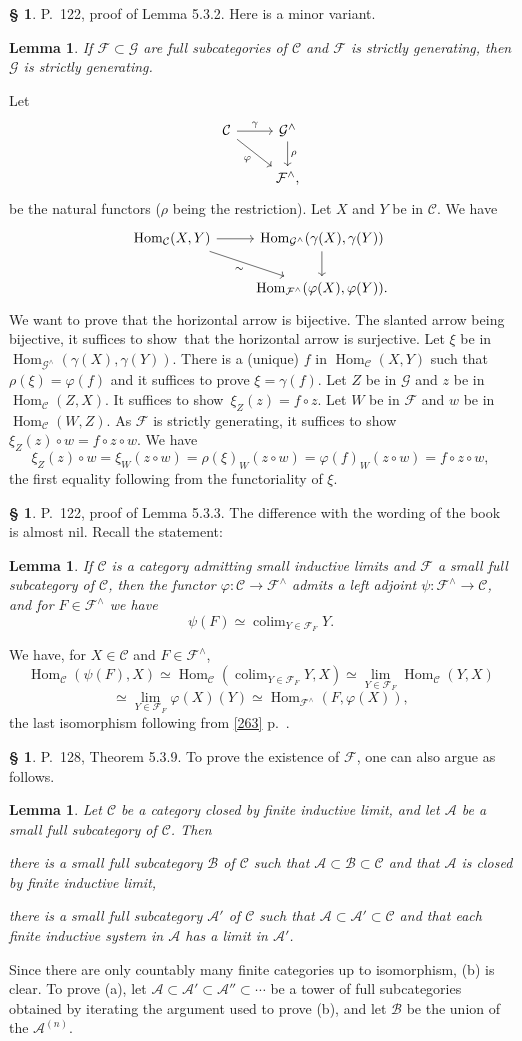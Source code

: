 \documentclass[12pt]{article}
\newtheorem{lem}[thm]{Lemma}
\theoremstyle{remark}
\theoremstyle{definition}
\newtheorem{cm}[thm]{\S}
\newcommand{\bc}{\begin{cm}}\newcommand{\ec}{\end{cm}}
\newcommand{\n}{\noindent}
\newcommand{\A}{\mathcal A}
\newcommand{\B}{\mathcal B}
\newcommand{\C}{\mathcal C}
\newcommand{\F}{\mathcal F}
\newcommand{\G}{\mathcal G}
\newcommand{\p}{\varphi}
\newcommand{\pf}{\n{\em Proof. }}
\newcommand{\bl}{\begin{lem}}
\newcommand{\el}{\end{lem}}
\newcommand{\sts}{t suffices to show}
\DeclareMathOperator*{\co}{colim}
\DeclareMathOperator{\h}{Hom}
\begin{document}

\bc P.~122, proof of Lemma 5.3.2. Here is a minor variant. 
%
\bl 
If $\F\subset\G$ are full subcategories of $\C$ and $\F$ is strictly generating, then $\G$ is strictly generating. 
\el 
%
\pf Let 
$$
\begin{tikzcd}
\C\ar{r}{\gamma}\ar{dr}[swap]{\p}&\G^\wedge\ar{d}{\rho}\\
&\F^\wedge,
\end{tikzcd}
$$ 
be the natural functors ($\rho$ being the restriction). Let $X$ and $Y$ be in $\C$. We have 
$$
\begin{tikzcd}
\h_\C(X,Y)\ar{r}\ar{dr}[swap]{\sim}&\h_{\G^\wedge}(\gamma(X),\gamma(Y))\ar{d}\\
&\h_{\F^\wedge}(\p(X),\p(Y)). 
\end{tikzcd}
$$ 
We want to prove that the horizontal arrow is bijective. The slanted arrow being bijective, i\sts\ that the horizontal arrow is surjective. Let $\xi$ be in $\h_{\G^\wedge}(\gamma(X),\gamma(Y))$. There is a (unique) $f$ in $\h_\C(X,Y)$ such that $\rho(\xi)=\p(f)$ and it suffices to prove $\xi=\gamma(f)$. Let $Z$ be in $\G$ and $z$ be in $\h_\C(Z,X)$. I\sts\ $\xi_Z(z)=f\circ z$. Let $W$ be in $\F$ and $w$ be in $\h_\C(W,Z)$. As $\F$ is strictly generating, i\sts\ $\xi_Z(z)\circ w=f\circ z\circ w$. We have 
$$
\xi_Z(z)\circ w=\xi_W(z\circ w)=\rho(\xi)_W(z\circ w)=\p(f)_W(z\circ w)
=f\circ z\circ w, 
$$ 
the first equality following from the functoriality of $\xi$.
\ec 


\bc P.~122, proof of Lemma 5.3.3. The difference with the wording of the book is almost nil. Recall the statement: 
% 
\bl
If $\C$ is a category admitting small inductive limits and $\F$ a small full subcategory of $\C$, then the functor $\p:\C\to\F^\wedge$ admits a left adjoint $\psi:\F^\wedge\to\C$, and for $F\in\F^\wedge$ we have 
$$
\psi(F)\simeq\co_{Y\in\F_F}Y. 
$$ 
\el 
% 
\pf We have, for $X\in\C$ and $F\in\F^\wedge$, 
$$
\h_\C(\psi(F),X)\simeq\h_\C\left(\co_{Y\in\F_F}Y,X\right)\simeq\lim_{Y\in\F_F}\h_\C(Y,X)
$$ 
$$
\simeq\lim_{Y\in\F_F}\p(X)(Y)\simeq\h_{\F^\wedge}(F,\p(X)),
$$ 
the last isomorphism following from \eqref{263} p.~\pageref{263}.
\ec 


\bc P.~128, Theorem 5.3.9. To prove the existence of $\F$, one can also argue as follows. 
% 
\begin{lem} 
% 
Let $\C$ be a category closed by finite inductive limit, and let $\A$ be a small full subcategory of $\C$. Then 

\n{\em(a)} there is a small full subcategory $\B$ of $\C$ such that $\A\subset\B\subset \C$ and that $\A$ is closed by finite inductive limit, 

\n{\em(b)} there is a small full subcategory $\A'$ of $\C$ such that $\A\subset\A'\subset \C$ and that each finite inductive system in $\A$ has a limit in $\A'$. 
%
\end{lem} 
% 
\n{\em Proof.} Since there are only countably many finite categories up to isomorphism, (b) is clear. To prove (a), let $\A\subset\A'\subset\A''\subset\cdots$ be a tower of full subcategories obtained by iterating the argument used to prove (b), and let $\B$ be the union of the $\A^{(n)}$.
\ec 
\end{document}
